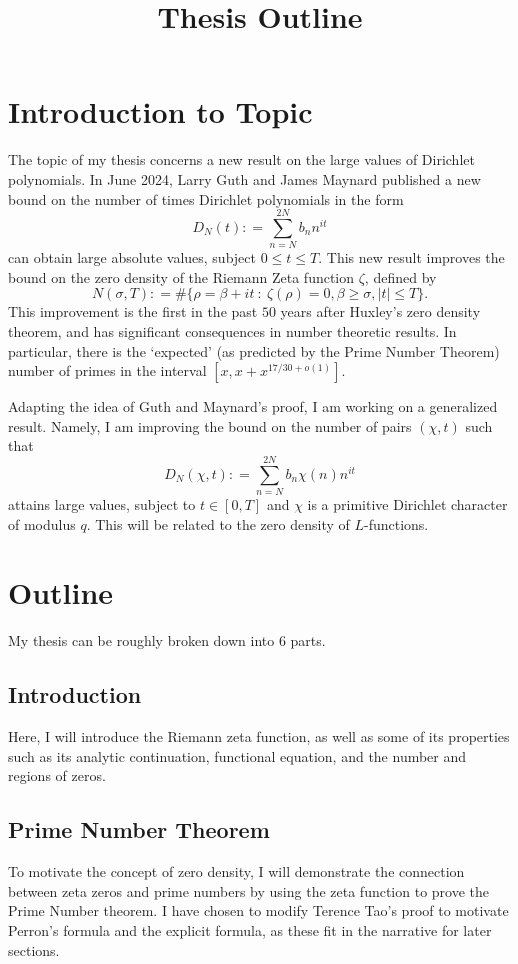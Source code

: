 \documentclass[
ngerman,
toc=flat,
toc=chapterentrywithdots,
captions=tableabove,
listof=entryprefix,
listof=leveldown,
fontsize=12pt,
numbers=noenddot]
{article}
\date{}
\title{Thesis Outline}
\newcommand{\defeq}{\mathrel{\mathop:}=}
\begin{document}
	\maketitle
\section{Introduction to Topic}
The topic of my thesis concerns a new result on the large values of Dirichlet polynomials. In June 2024, Larry Guth and James Maynard published a new bound on the number of times Dirichlet polynomials in the form \[
	D_N(t)\defeq \sum_{n=N}^{2N} b_n n^{it}
\]
can obtain large absolute values, subject $0\leq t\leq T$. This new result improves the bound on the zero density of the Riemann Zeta function $\zeta$, defined by \[
N(\sigma, T)\defeq \# \{\rho = \beta+it \ : \ \zeta(\rho)=0, \beta\geq \sigma, |t|\leq T\}.
\]
This improvement is the first in the past $50$ years after Huxley's zero density theorem, and has significant consequences in number theoretic results. In particular, there is the `expected' (as predicted by the Prime Number Theorem) number of primes in the interval $[x,x+x^{17/30+o(1)}]$. 

Adapting the idea of Guth and Maynard's proof, I am working on a generalized result. Namely, I am improving the bound on the number of pairs $(\chi,t)$ such that \[
D_N(\chi,t)\defeq \sum_{n=N}^{2N} b_n \chi(n) n^{it}
\]
attains large values, subject to $t\in [0,T]$ and $\chi$ is a primitive Dirichlet character of modulus $q$. This will be related to the zero density of $L$-functions.

\section{Outline}
My thesis can be roughly broken down into $6$ parts.
\subsection{Introduction}
Here, I will introduce the Riemann zeta function, as well as some of its properties such as its analytic continuation, functional equation, and the number and regions of zeros.
\subsection{Prime Number Theorem}
To motivate the concept of zero density, I will demonstrate the connection between zeta zeros and prime numbers by using the zeta function to prove the Prime Number theorem. I have chosen to modify Terence Tao's proof to motivate Perron's formula and the explicit formula, as these fit in the narrative for later sections.
\end{document}
